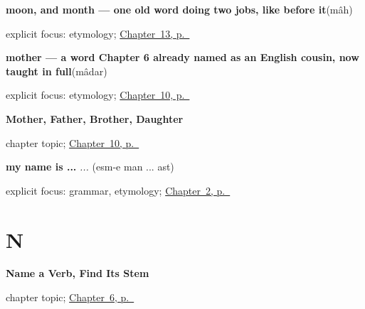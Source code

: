 \noindent\begin{minipage}[t]{\linewidth}
\raggedright
\textbf{moon, and month — one old word doing two jobs, like  before it}\enspace\emph{}\enspace(mâh)\par
\footnotesize explicit focus: etymology; \hyperref[ch:fa-sky-words]{Chapter~13, p.~\pageref*{ch:fa-sky-words}}
\end{minipage}\par\smallskip

\noindent\begin{minipage}[t]{\linewidth}
\raggedright
\textbf{mother — a word Chapter 6 already named as an English cousin, now taught in full}\enspace\emph{}\enspace(mâdar)\par
\footnotesize explicit focus: etymology; \hyperref[ch:fa-family]{Chapter~10, p.~\pageref*{ch:fa-family}}
\end{minipage}\par\smallskip

\noindent\begin{minipage}[t]{\linewidth}
\raggedright
\textbf{Mother, Father, Brother, Daughter}\par
\footnotesize chapter topic; \hyperref[ch:fa-family]{Chapter~10, p.~\pageref*{ch:fa-family}}
\end{minipage}\par\smallskip

\noindent\begin{minipage}[t]{\linewidth}
\raggedright
\textbf{my name is ...}\enspace\emph{  ... }\enspace(esm-e man ... ast)\par
\footnotesize explicit focus: grammar, etymology; \hyperref[ch:persian-name]{Chapter~2, p.~\pageref*{ch:persian-name}}
\end{minipage}\par\smallskip

\section*{N}

\noindent\begin{minipage}[t]{\linewidth}
\raggedright
\textbf{Name a Verb, Find Its Stem}\par
\footnotesize chapter topic; \hyperref[ch:fa-core-verbs]{Chapter~6, p.~\pageref*{ch:fa-core-verbs}}
\end{minipage}\par\smallskip

